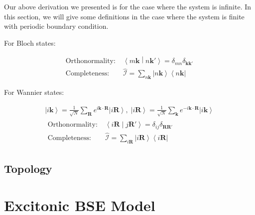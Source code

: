 \documentclass{report}
\begin{document}
Our above derivation we presented is for the case where the system is infinite.
In this section, we will give some definitions in the case where the system is finite with periodic boundary condition.

\noindent
For Bloch states:

\begin{equation}
  \begin{aligned}
    \text{Orthonormality:} \;&
    \left\langle m\boldsymbol{k} \middle| n\boldsymbol{k}' \right\rangle 
      = \delta_{mn} \delta_{\boldsymbol{k}\boldsymbol{k}'} \\
    \text{Completeness:} \;&
    \hat{\mathcal{I}} = \sum_{n\boldsymbol{k}} \left| n\boldsymbol{k} \right\rangle \left\langle n\boldsymbol{k} \right| 
  \end{aligned}
\end{equation}

\noindent
For Wannier states:

\begin{equation}
  \begin{gathered}
    \left| i\boldsymbol{k} \right\rangle 
      = \frac{1}{\sqrt{N}} \sum_{\boldsymbol{R}} e^{i\boldsymbol{k} \cdot \boldsymbol{R}} \left| i\boldsymbol{R} \right\rangle ,\;
    \left| i\boldsymbol{R} \right\rangle 
      = \frac{1}{\sqrt{N}} \sum_{\boldsymbol{k}} e^{-i\boldsymbol{k} \cdot \boldsymbol{R}} 
        \left| i\boldsymbol{k} \right\rangle \\
    \begin{aligned}
      \text{Orthonormality:} \;&
        \left\langle i\boldsymbol{R} \middle| j\boldsymbol{R}' \right\rangle = \delta_{ij} \delta_{\boldsymbol{R}\boldsymbol{R}'} \\
      \text{Completeness:} \;&
        \hat{\mathcal{I}} = \sum_{i\boldsymbol{R}} \left| i\boldsymbol{R} \right\rangle \left\langle i\boldsymbol{R} \right| 
    \end{aligned}
  \end{gathered}
\end{equation}

\section{Topology}



\newpage

\chapter{Excitonic BSE Model}
\end{document}
